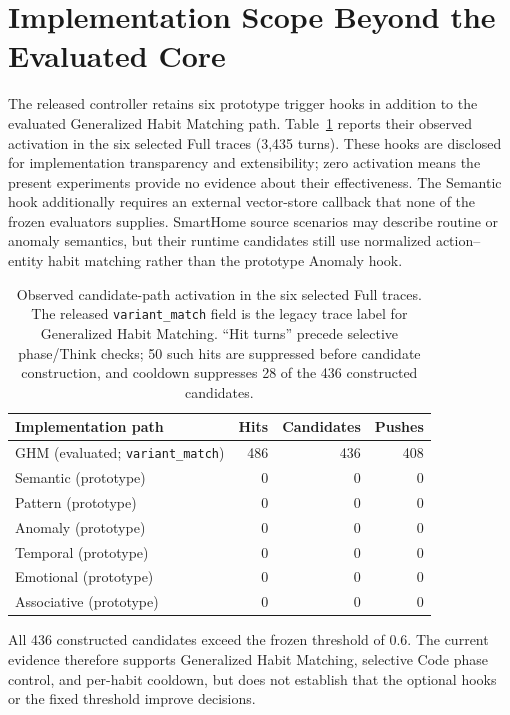 \section{Implementation Scope Beyond the Evaluated Core}
\label{app:implementation_scope}

The released controller retains six prototype trigger hooks in addition to the evaluated Generalized Habit Matching path.
Table~\ref{tab:trigger_activation} reports their observed activation in the six selected Full traces (3,435 turns).
These hooks are disclosed for implementation transparency and extensibility; zero activation means the present experiments provide no evidence about their effectiveness.
The Semantic hook additionally requires an external vector-store callback that none of the frozen evaluators supplies.
SmartHome source scenarios may describe routine or anomaly semantics, but their runtime candidates still use normalized action--entity habit matching rather than the prototype Anomaly hook.

\begin{table}[h]
\centering
\caption{Observed candidate-path activation in the six selected Full traces. The released \texttt{variant\_match} field is the legacy trace label for Generalized Habit Matching. ``Hit turns'' precede selective phase/Think checks; 50 such hits are suppressed before candidate construction, and cooldown suppresses 28 of the 436 constructed candidates.}
\label{tab:trigger_activation}
\footnotesize
\setlength{\tabcolsep}{4pt}
\begin{tabular}{@{}lrrr@{}}
\toprule
Implementation path & Hits & Candidates & Pushes \\
\midrule
GHM (evaluated; \texttt{variant\_match}) & 486 & 436 & 408 \\
Semantic (prototype) & 0 & 0 & 0 \\
Pattern (prototype) & 0 & 0 & 0 \\
Anomaly (prototype) & 0 & 0 & 0 \\
Temporal (prototype) & 0 & 0 & 0 \\
Emotional (prototype) & 0 & 0 & 0 \\
Associative (prototype) & 0 & 0 & 0 \\
\bottomrule
\end{tabular}
\end{table}

All 436 constructed candidates exceed the frozen threshold of 0.6.
The current evidence therefore supports Generalized Habit Matching, selective Code phase control, and per-habit cooldown, but does not establish that the optional hooks or the fixed threshold improve decisions.
